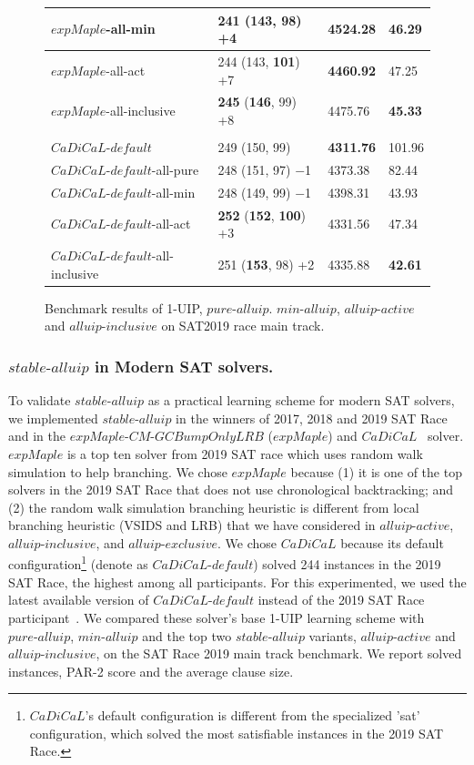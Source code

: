 \documentclass[runningheads]{llncs}
\newcommand{\oneuip}{1-UIP\xspace}
\newcommand{\stablealluip}{\textit{stable-alluip}\xspace}
\newcommand{\allUipPure}{\textit{pure-alluip}\xspace}
\newcommand{\allUipMin}{\textit{min-alluip}\xspace}
\newcommand{\allUipAct}{\textit{alluip-active}}
\newcommand{\allUipIn}{\textit{alluip-inclusive}}
\newcommand{\allUipEx}{\textit{alluip-exclusive}}
\newcommand{\expSAT}{\textit{expMaple-CM-GCBumpOnlyLRB} }
\newcommand{\expSATShort}{\textit{expMaple} }
\newcommand{\cadical}{\textit{CaDiCaL}}
\newcommand{\defaultcadical}{\textit{CaDiCaL-default}}
\begin{document}
\begin{figure}
\begin{center}
\begin{tabular}{|l|l|l|l|}
\hline
$\expSATShort$-all-min & 241 (143, 98) +4 & 4524.28 & 46.29 \\ 
\hline
$\expSATShort$-all-act & 244 (143, \textbf{101}) +7 & \textbf{4460.92} & 47.25 \\
\hline
$\expSATShort$-all-inclusive & \textbf{245} (\textbf{146}, 99) +8 & 4475.76 & \textbf{45.33}
\\
\hline
\hline
 & & &\\
$\defaultcadical$ & 249 (150, 99)  & \textbf{4311.76} & 101.96 \\
\hline
$\defaultcadical$-all-pure & 248 (151, 97) $-$1  & 4373.38 & 82.44  \\
\hline
$\defaultcadical$-all-min & 248 (149, 99) $-$1 & 4398.31 & 43.93 \\ 
\hline
$\defaultcadical$-all-act & \textbf{252} (\textbf{152}, \textbf{100}) +3 & 4331.56 & 47.34 \\
\hline
$\defaultcadical$-all-inclusive & 251 (\textbf{153}, 98) +2 & 4335.88 & \textbf{42.61}
\\
\hline
\end{tabular}
\end{center}
\caption{Benchmark results of \oneuip, $\allUipPure$. $\allUipMin$, $\allUipAct$ and $\allUipIn$ on SAT2019 race main track.}
\label{fig:t5}
\end{figure}


\subsubsection{$\stablealluip$ in Modern SAT solvers.}
\begin{sloppypar}
To validate $\stablealluip$ as a practical learning scheme for modern
SAT solvers, we implemented $\stablealluip$ in the winners of 2017,
2018 and 2019 SAT Race
\cite{DBLP:conf/ijcai/LuoLXML17,ryvchin2018maple,Stepan2019MapleLCMDistChronoBT}
and in the $\expSAT$ \cite{MdSolimul2019expMalpe} ($\expSATShort$)
and $\cadical$~\cite{cadical} solver. $\expSATShort$ is a top ten solver from 2019 SAT race which
uses random walk simulation to help branching. We chose $\expSATShort$
because (1) it is one of the top solvers in the 2019 SAT Race that does
not use chronological backtracking; and (2) the random walk simulation
branching heuristic is different from local branching heuristic (VSIDS
and LRB) that we have considered in $\allUipAct$, $\allUipIn$, and
$\allUipEx$. We chose $\cadical$ because its default configuration\footnote{$\cadical$'s 
default configuration is different from the specialized 'sat' configuration, 
which solved the most satisfiable instances in the 2019 SAT Race.} (denote as $\defaultcadical$) 
solved 244 instances in the 2019 SAT Race, the highest among 
all participants. For this experimented, we used the latest available version of
 $\defaultcadical$ instead of the 2019 SAT Race participant~\cite{Armin2019Cadical}. 
  We compared these solver's base \oneuip learning scheme
with $\allUipPure$, $\allUipMin$ and the top two $\stablealluip$
variants, $\allUipAct$ and $\allUipIn$, on the SAT Race 2019 main
track benchmark. We report solved instances, PAR-2 score and the
average clause size.
\end{sloppypar}
\end{document}
